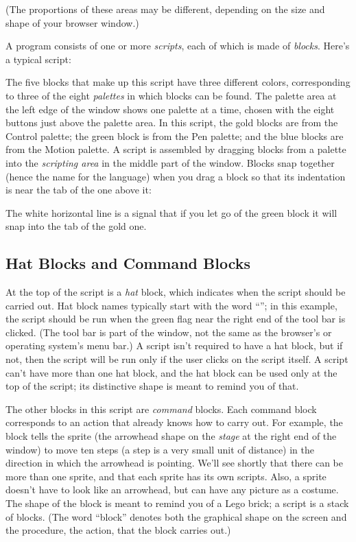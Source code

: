 \documentclass{report}
\begin{document}
(The proportions of these areas may be different, depending on the size and shape of your browser window.)

A \Snap{} program consists of one or more \emph{scripts}, each of which is made of \emph{blocks}. Here's a typical script:\nopagebreak

\label{fig:typical-script}

The five blocks that make up this script have three different colors, corresponding to three of the eight \emph{palettes} in which blocks can be found. The palette area at the left edge of the window shows one palette at a time, chosen with the eight buttons just above the palette area. In this script, the gold blocks are from the Control palette; the green block is from the Pen palette; and the blue blocks are from the Motion palette. A script is assembled by dragging blocks from a palette into the \emph{scripting area} in the middle part of the window. Blocks snap together (hence the name \Snap{} for the language) when you drag a block so that its indentation is near the tab of the one above it:\nopagebreak


The white horizontal line is a signal that if you let go of the green block it will snap into the tab of the gold one.

\subsection{Hat Blocks and Command Blocks}

At the top of the script is a \emph{hat} block, which indicates when the script should be carried out. Hat block names typically start with the word ``''; in this example, the script should be run when the green flag near the right end of the \Snap{} tool bar is clicked. (The \Snap{} tool bar is part of the \Snap{} window, not the same as the browser's or operating system's menu bar.) A script isn't required to have a hat block, but if not, then the script will be run only if the user clicks on the script itself. A script can't have more than one hat block, and the hat block can be used only at the top of the script; its distinctive shape is meant to remind you of that.

The other blocks in this script are \emph{command} blocks. Each command block corresponds to an action that \Snap{} already knows how to carry out. For example, the block  tells the sprite (the arrowhead shape on the \emph{stage} at the right end of the window) to move ten steps (a step is a very small unit of distance) in the direction in which the arrowhead is pointing. We'll see shortly that there can be more than one sprite, and that each sprite has its own scripts. Also, a sprite doesn't have to look like an arrowhead, but can have any picture as a costume. The shape of the  block is meant to remind you of a Lego\texttrademark{} brick; a script is a stack of blocks. (The word ``block'' denotes both the graphical shape on the screen and the procedure, the action, that the block carries out.)
\end{document}
